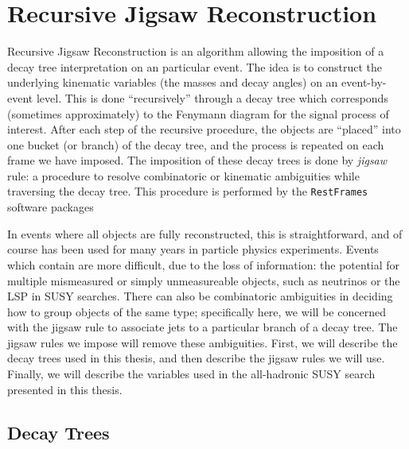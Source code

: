\section{Recursive Jigsaw Reconstruction}

Recursive Jigsaw Reconstruction is an algorithm allowing the imposition of a decay tree interpretation on an particular event\cite{Jackson:2016mfb,ATLAS-CONF-2016-078}.
The idea is to construct the underlying kinematic variables (the masses and decay angles) on an event-by-event level.
This is done ``recursively'' through a decay tree which corresponds (sometimes approximately) to the Fenymann diagram for the signal process of interest.
After each step of the recursive procedure, the objects are ``placed'' into one bucket (or branch) of the decay tree, and the process is repeated on each frame we have imposed.
The imposition of these decay trees is done by \textit{jigsaw} rule: a procedure to resolve combinatoric or kinematic ambiguities while traversing the decay tree.
This procedure is performed by the \texttt{RestFrames} software packages \cite{RestFrames}

In events where all objects are fully reconstructed, this is straightforward, and of course has been used for many years in particle physics experiments.
Events which contain \met are more difficult, due to the loss of information: the potential for multiple mismeasured or simply unmeasureable objects, such as neutrinos or the LSP in SUSY searches.
There can also be combinatoric ambiguities in deciding how to group objects of the same type; specifically here, we will be concerned with the jigsaw rule to associate jets to a particular branch of a decay tree.
The jigsaw rules we impose will remove these ambiguities.
First, we will describe the decay trees used in this thesis, and then describe the jigsaw rules we will use.
Finally, we will describe the variables used in the all-hadronic SUSY search presented in this thesis.

\subsection{Decay Trees}

